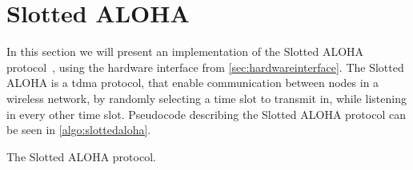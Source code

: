 \section{Slotted ALOHA}\label{sec:saloha}
In this section we will present an implementation of the Slotted ALOHA protocol~\cite{Roberts:1975:APS:1024916.1024920}, using the hardware interface from \autoref{sec:hardwareinterface}. The Slotted ALOHA is a \gls{tdma} protocol, that enable communication between nodes in a wireless network, by randomly selecting a time slot to transmit in, while listening in every other time slot. Pseudocode describing the Slotted ALOHA protocol can be seen in \autoref{algo:slottedaloha}. \medbreak


\begin{algorithm}[ht]
    \DontPrintSemicolon


    \caption{The Slotted ALOHA protocol.}
    \label{algo:slottedaloha}
\end{algorithm}

